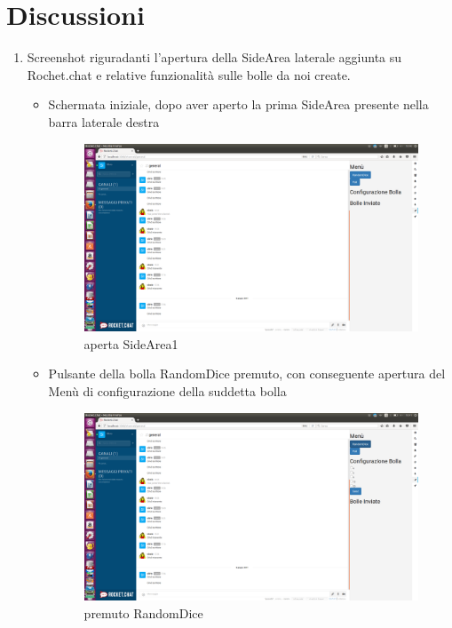 \documentclass[10 pt,a4paper, openany]{article}
\begin{document}
\section{Discussioni}
\begin{enumerate}
	\item Screenshot riguradanti l'apertura della SideArea laterale aggiunta su Rochet.chat e relative funzionalità sulle bolle da noi create.
	
		\begin{itemize}
			\item Schermata iniziale, dopo aver aperto la prima SideArea presente nella barra laterale destra
			
				\FloatBarrier
				\begin{figure}[ht]
					\centering
					\includegraphics[scale=0.20]{img/1.png}
					\caption{aperta SideArea1}
				\end{figure}
			
			\clearpage
			
			\item  Pulsante della bolla RandomDice premuto, con conseguente apertura del Menù di configurazione della suddetta bolla
			
				\FloatBarrier
				\begin{figure}[ht]
					\centering
					\includegraphics[scale=0.20]{img/2.png}
					\caption{premuto RandomDice}
				\end{figure}
			\clearpage
				

\end{itemize}
\end{enumerate}
\end{document}
